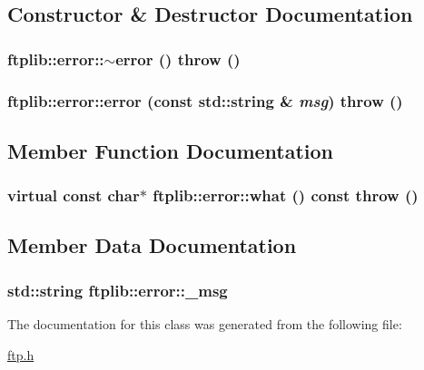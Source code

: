 \subsection{Constructor \& Destructor Documentation}
\hypertarget{classftplib_1_1error_833d787900e419f2bd6dc28dee5d4834}{
\subsubsection[{$\sim$error}]{\setlength{\rightskip}{0pt plus 5cm}ftplib::error::$\sim$error ()  throw ()}}
\label{classftplib_1_1error_833d787900e419f2bd6dc28dee5d4834}


\hypertarget{classftplib_1_1error_27f41492c41876849d85237668cf53b6}{
\subsubsection[{error}]{\setlength{\rightskip}{0pt plus 5cm}ftplib::error::error (const std::string \& {\em msg})  throw ()}}
\label{classftplib_1_1error_27f41492c41876849d85237668cf53b6}




\subsection{Member Function Documentation}
\hypertarget{classftplib_1_1error_0205a5c32e446c5d7c792c708220b1a7}{
\subsubsection[{what}]{\setlength{\rightskip}{0pt plus 5cm}virtual const char$\ast$ ftplib::error::what () const  throw ()}}
\label{classftplib_1_1error_0205a5c32e446c5d7c792c708220b1a7}




\subsection{Member Data Documentation}
\hypertarget{classftplib_1_1error_a7a7c753067df4b1c6ee4aefa2139f79}{
\subsubsection[{\_\-msg}]{\setlength{\rightskip}{0pt plus 5cm}std::string {\bf ftplib::error::\_\-msg}}}
\label{classftplib_1_1error_a7a7c753067df4b1c6ee4aefa2139f79}




The documentation for this class was generated from the following file:\begin{CompactItemize}
\item 
\hyperlink{ftp_8h}{ftp.h}\end{CompactItemize}
